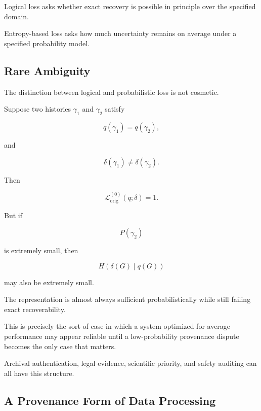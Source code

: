 \documentclass[
  11pt,
  a4paper,
  DIV=12,
  BCOR=0mm,
  parskip=half-
]{scrartcl}
\newcommand{\lossorig}{%
  \mathscr L_{\mathrm{orig}}%
}
\theoremstyle{definition}
\theoremstyle{plain}
\theoremstyle{remark}
\begin{document}
Logical loss asks whether exact recovery is possible in principle over the
specified domain.

Entropy-based loss asks how much uncertainty remains on average under a
specified probability model.


\subsection{Rare Ambiguity}
\label{app:rare-ambiguity}

The distinction between logical and probabilistic loss is not cosmetic.

Suppose two histories \(\gamma_1\) and \(\gamma_2\) satisfy

\[
  q(\gamma_1)=q(\gamma_2),
\]

and

\[
  \delta(\gamma_1)\neq\delta(\gamma_2).
\]

Then

\[
  \lossorig^{(0)}(q;\delta)=1.
\]

But if

\[
  P(\gamma_2)
\]

is extremely small, then

\[
  H(\delta(G)\mid q(G))
\]

may also be extremely small.

The representation is almost always sufficient probabilistically while still
failing exact recoverability.

This is precisely the sort of case in which a system optimized for average
performance may appear reliable until a low-probability provenance dispute
becomes the only case that matters.

Archival authentication, legal evidence, scientific priority, and safety
auditing can all have this structure.


\subsection{A Provenance Form of Data Processing}
\label{app:data-processing}
\end{document}
